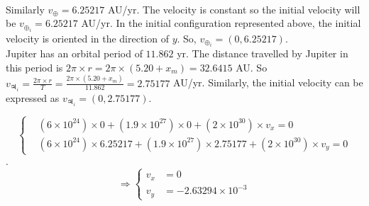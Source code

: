 \documentclass[a4paper, twoside, 11pt]{report}
\theoremstyle{theorem}
\theoremstyle{remark}
\theoremstyle{exemple}
\begin{document}
            \paragraph{}Similarly $v_{\oplus} = 6.25217$ AU/yr. The velocity is constant so the initial velocity will be $v_{\oplus_i}=6.25217$ AU/yr. In the initial configuration represented above, the initial velocity is oriented in the direction of $y$. So, $v_{\oplus_i} = \left(0, 6.25217\right)$. \\
            Jupiter has an orbital period of $11.862$ yr. The distance travelled by Jupiter in this period is $2 \pi \times r = 2 \pi \times (5.20 + x_m) = 32.6415 $ AU. So $v_{\jupiter_i}= \frac{2 \pi \times r}{T} = \frac{2 \pi \times (5.20+x_m)}{11.862} = 2.75177 $ AU/yr. Similarly, the initial velocity can be expressed as $v_{\jupiter_i} = \left(0, 2.75177\right)$.
            
                \begin{equation*}
                    \left\{
                        \begin{aligned}
                            &(6\times 10^{24}) \times 0 + (1.9 \times 10^{27}) \times 0 + (2 \times 10^{30}) \times v_x = 0 \\
                            &(6\times 10^{24}) \times 6.25217 + (1.9 \times 10^{27}) \times 2.75177 + (2 \times 10^{30}) \times v_y = 0
                        \end{aligned}
                    \right.
                \end{equation*}.
                \begin{equation*}
                   \Longrightarrow \left\{
                        \begin{aligned}
                            v_x &= 0\\
                            v_y &= - 2.63294 \times 10^{-3}
                        \end{aligned}
                    \right.
                    \tag{9}
                \end{equation*}
\end{document}
